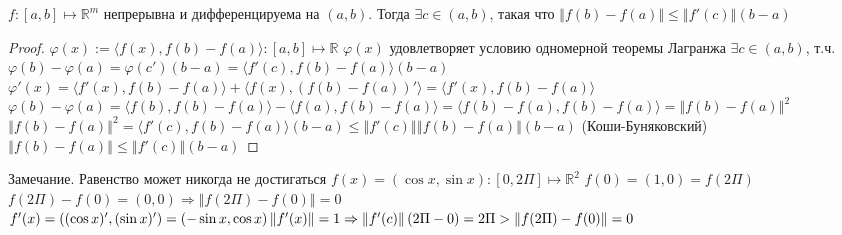 
\begin{theorem} \thmslashn

    $f : [a, b] \mapsto \mathbb{R}^m$ непрерывна и дифференцируема на $(a, b)$. Тогда $\exists c \in (a, b)$, такая что $\left\Vert f(b) - f(a) \right\Vert \leqslant \left\Vert f'(c)\right\Vert(b - a)$
    \begin{proof} \thmslashn

	$\varphi(x) := \langle f(x), f(b) - f(a)\rangle : [a, b] \mapsto \mathbb{R}$\newline
	$\varphi(x)$ удовлетворяет условию одномерной теоремы Лагранжа\newline
	$\exists c \in (a, b)$, т.ч. $\varphi(b) - \varphi(a) = \varphi(c')(b - a) = \langle f'(c), f(b) - f(a)\rangle(b - a)$\newline
	$\varphi'(x) = \langle f'(x), f(b) - f(a)\rangle + \langle f(x), (f(b) - f(a))'\rangle = \langle f'(x), f(b) - f(a)\rangle$\newline
        $\varphi(b) - \varphi(a) = \langle f(b), f(b) - f(a)\rangle - \langle f(a), f(b) - f(a)\rangle = \langle f(b) - f(a), f(b) - f(a)\rangle = \left\Vert f(b) - f(a) \right\Vert^2$\newline 
        $\left\Vert f(b) - f(a) \right \Vert^2 = \langle f'(c), f(b) - f(a)\rangle(b - a) \leqslant \left \Vert f'(c) \right\Vert \left \Vert f(b) - f(a) \right \Vert (b - a)$ (Коши-Буняковский)\newline
        $\left\Vert f(b) - f(a)\right\Vert \leqslant \left\Vert f'(c) \right\Vert(b - a)$
    \end{proof}
    \item Замечание. Равенство может никогда не достигаться \newline
	$f(x) = (\cos{x}, \sin{x}) : [0, 2\Pi] \mapsto \mathbb{R}^2$\newline
	$f(0) = (1, 0) = f(2\Pi)$\newline
	$f(2\Pi) - f(0) = (0, 0) \Rightarrow \left\Vert f(2\Pi) - f(0) \right\Vert = 0$\newline
	$f'(x) = ((\cos{x})', (\sin{x})') = (-\sin{x}, \cos{x})\newline
	\left\Vert f'(x) \right\Vert = 1 \Rightarrow \left\Vert f'(c) \right\Vert (2\Pi - 0) = 2\Pi > \left\Vert f(2\Pi) - f(0) \right\Vert = 0$

\end{theorem}

